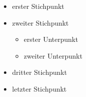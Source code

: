 \documentclass{article}
\begin{document}
\begin{itemize}
\item erster Stichpunkt
\item zweiter Stichpunkt
\begin{itemize}
\item erster Unterpunkt
\item zweiter Unterpunkt
\end{itemize}
\item dritter Stichpunkt
\item letzter Stichpunkt
\end{itemize}
\end{document}
